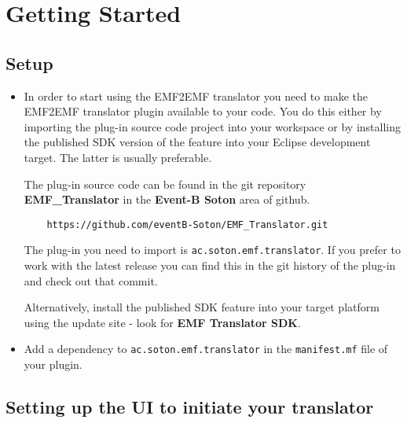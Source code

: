 \section{Getting Started}
\label{sec:getting-started}

\subsection{Setup}
\label{sec:setup}

\begin{itemize}
\item 
In order to start using the EMF2EMF translator you need to make the EMF2EMF translator plugin available to your code. 
You do this either by importing the plug-in source code project into your workspace or by installing the published SDK version of the feature into your Eclipse development target.
The latter is usually preferable.

The plug-in source code can be found in the git repository \textbf{EMF\_Translator} in the \textbf{Event-B Soton} area of github.   
\begin{verbatim}
	https://github.com/eventB-Soton/EMF_Translator.git
\end{verbatim}
The plug-in you need to import is \texttt{ac.soton.emf.translator}.
If you prefer to work with the latest release you can find this in the git history of the plug-in and check out that commit.

Alternatively, install the published SDK feature into your target platform using the update site - look for \textbf{EMF Translator SDK}.
\item 
Add a dependency to \texttt{ac.soton.emf.translator} in the \texttt{manifest.mf} file of your plugin.
\end{itemize}

\subsection{Setting up the UI to initiate your translator}
\label{sec:ui}

